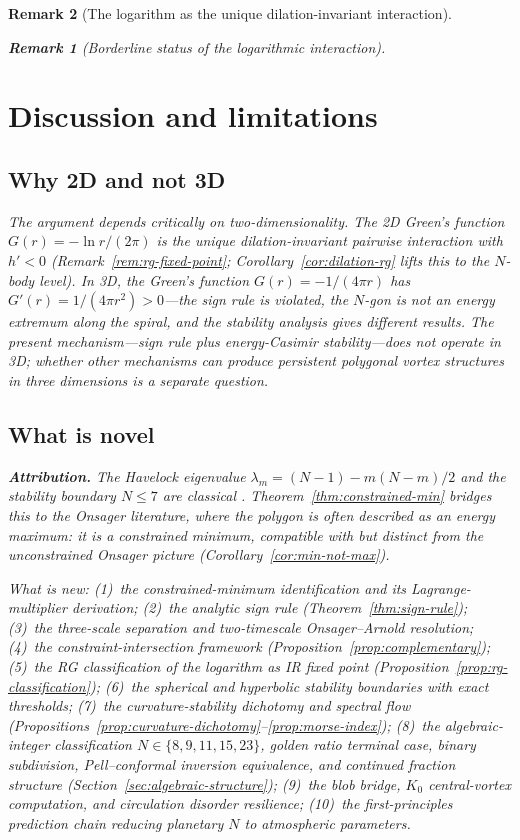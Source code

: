 \documentclass[12pt, a4paper]{article}
\newtheorem{remark}{Remark}[section]
\numberwithin{equation}{section}
\begin{document}
\begin{remark}[The logarithm as the unique dilation-invariant interaction]
\begin{remark}[Borderline status of the logarithmic interaction]
\section{Discussion and limitations}
\label{sec:discussion-new}

\subsection{Why 2D and not 3D}

The argument depends critically on two-dimensionality.  The 2D Green's
function $G(r) = -\ln r/(2\pi)$ is the unique dilation-invariant
pairwise interaction with $h' < 0$
(Remark~\ref{rem:rg-fixed-point}; Corollary~\ref{cor:dilation-rg}
lifts this to the $N$-body level).  In 3D, the Green's function
$G(r) = -1/(4\pi r)$ has $G'(r) = 1/(4\pi r^2) > 0$---the sign
rule is violated, the $N$-gon is not an energy extremum along the
spiral, and the stability analysis gives different results.  The
present mechanism---sign rule plus energy-Casimir stability---does
not operate in 3D; whether other mechanisms can produce persistent
polygonal vortex structures in three dimensions is a separate
question.


\subsection{What is novel}

\noindent\textbf{Attribution.}
The Havelock eigenvalue $\lambda_m = (N{-}1) - m(N{-}m)/2$ and the
stability boundary $N \le 7$ are classical \citep{Havelock1931}.
Theorem~\ref{thm:constrained-min} bridges this to the Onsager
literature, where the polygon is often described as an energy
maximum: it is a constrained minimum, compatible with but distinct
from the unconstrained Onsager picture (Corollary~\ref{cor:min-not-max}).

\smallskip\noindent
What is new:
(1)~the constrained-minimum identification and its
Lagrange-multiplier derivation;
(2)~the analytic sign rule (Theorem~\ref{thm:sign-rule});
(3)~the three-scale separation and two-timescale Onsager--Arnold
resolution;
(4)~the constraint-intersection framework
(Proposition~\ref{prop:complementary});
(5)~the RG classification of the logarithm as IR fixed point
(Proposition~\ref{prop:rg-classification});
(6)~the spherical and hyperbolic stability boundaries
with exact thresholds;
(7)~the curvature-stability dichotomy and spectral flow
(Propositions~\ref{prop:curvature-dichotomy}--\ref{prop:morse-index});
(8)~the algebraic-integer classification $N \in \{8,9,11,15,23\}$,
golden ratio terminal case, binary subdivision, Pell--conformal
inversion equivalence, and continued fraction structure
(Section~\ref{sec:algebraic-structure});
(9)~the blob bridge, $K_0$ central-vortex computation, and
circulation disorder resilience;
(10)~the first-principles prediction chain reducing planetary
$N$ to atmospheric parameters.


\end{remark}
\end{remark}
\end{document}
